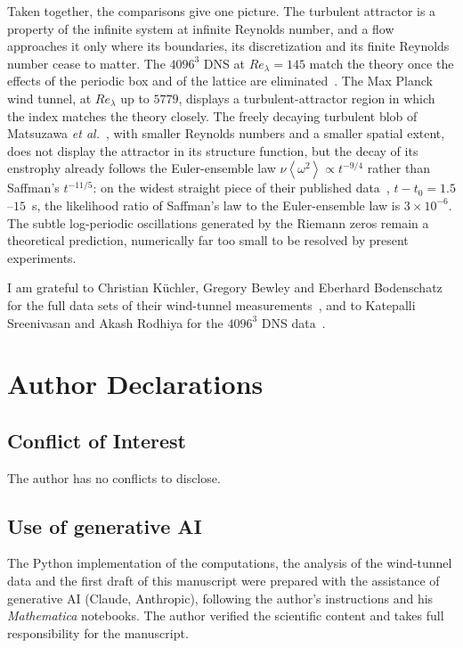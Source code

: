 \documentclass[aip,pof,preprint,floatfix,nofootinbib,amsmath,amssymb]{revtex4-2}
\def\VEV#1{\left\langle #1 \right\rangle}
\def\Mathematica{\textit{Mathematica}}
\begin{document}
Taken together, the comparisons give one picture. The turbulent attractor is a property of the infinite system at infinite
Reynolds number, and a flow approaches it only where its boundaries, its discretization and its finite Reynolds number cease
to matter. The $4096^3$ DNS at $Re_\lambda=145$ match the theory once the effects of the periodic box and of the lattice are
eliminated~\cite{ReviewPaperAM,SreeniAkash2025}. The Max Planck wind tunnel, at $Re_\lambda$ up to $5779$, displays a
turbulent-attractor region in which the index matches the theory closely. The freely decaying turbulent blob of Matsuzawa
\emph{et al.}~\cite{Matsuzawa2026}, with smaller Reynolds numbers and a smaller spatial extent, does not display the
attractor in its structure function, but the decay of its enstrophy already follows the Euler-ensemble law
$\nu\VEV{\omega^2}\propto t^{-9/4}$ rather than Saffman's $t^{-11/5}$: on the widest straight piece of their published
data~\cite{MatsuzawaData2026}, $t-t_0=1.5$--$15$~s, the likelihood ratio of Saffman's law to the Euler-ensemble law is
$3\times10^{-6}$. The subtle log-periodic oscillations generated by the Riemann zeros remain a theoretical prediction,
numerically far too small to be resolved by present experiments.

\clearpage
\begin{acknowledgments}
I am grateful to Christian Küchler, Gregory Bewley and Eberhard Bodenschatz for the full data sets of their wind-tunnel
measurements~\cite{GregXi2}, and to Katepalli Sreenivasan and Akash Rodhiya for the $4096^3$ DNS data~\cite{SreeniAkash2025}.
\end{acknowledgments}

\section*{Author Declarations}
\subsection*{Conflict of Interest}
The author has no conflicts to disclose.

\subsection*{Use of generative AI}
The Python implementation of the computations, the analysis of the wind-tunnel data and the first draft of this manuscript were
prepared with the assistance of generative AI (Claude, Anthropic), following the author's instructions and his \Mathematica{}
notebooks. The author verified the scientific content and takes full responsibility for the manuscript.
\end{document}
